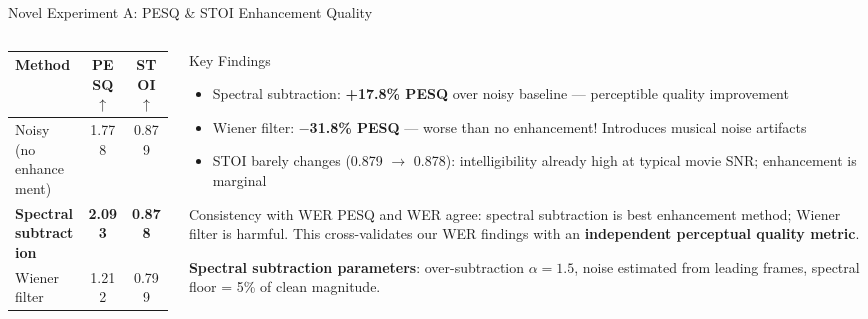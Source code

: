 \documentclass[aspectratio=169]{beamer}
\begin{document}
\begin{frame}{Novel Experiment A: PESQ \& STOI Enhancement Quality}
\begin{columns}[T]
\begin{column}{0.55\textwidth}
      \vspace{0.2cm}
      \begin{center}
        \begin{tabular}{@{}lcc@{}}
          \toprule
          \textbf{Method} & \textbf{PESQ} $\uparrow$ & \textbf{STOI} $\uparrow$ \\
          \midrule
          Noisy (no enhancement) & 1.778 & 0.879 \\
          \rowcolor{lightgray}
          \textbf{Spectral subtraction} & \textbf{2.093} & \textbf{0.878} \\
          Wiener filter & 1.212 & 0.799 \\
          \bottomrule
        \end{tabular}
      \end{center}
    \end{column}
    \begin{column}{0.42\textwidth}
      \begin{block}{Key Findings}
        \begin{itemize}
          \item Spectral subtraction: \textbf{+17.8\% PESQ} over noisy baseline — perceptible quality improvement
          \item Wiener filter: \textbf{$-$31.8\% PESQ} — worse than no enhancement! Introduces musical noise artifacts
          \item STOI barely changes (0.879 $\to$ 0.878): intelligibility already high at typical movie SNR; enhancement is marginal
        \end{itemize}
      \end{block}
      \begin{alertblock}{Consistency with WER}
        PESQ and WER agree: spectral subtraction is best enhancement method; Wiener filter is harmful. This cross-validates our WER findings with an \textbf{independent perceptual quality metric}.
      \end{alertblock}
      \vspace{0.2cm}
      \small \textbf{Spectral subtraction parameters}: over-subtraction $\alpha=1.5$, noise estimated from leading frames, spectral floor = 5\% of clean magnitude.
    \end{column}
  \end{columns}
\end{frame}
\end{document}
